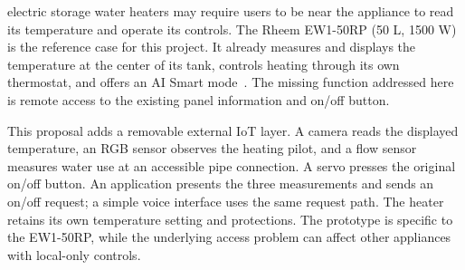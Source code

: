  electric storage water heaters may require users to be near the appliance to read its temperature and operate its controls. The Rheem EW1-50RP (50 L, 1500 W) is the reference case for this project. It already measures and displays the temperature at the center of its tank, controls heating through its own thermostat, and offers an AI Smart mode~\cite{rheemmanual}. The missing function addressed here is remote access to the existing panel information and on/off button.

This proposal adds a removable external IoT layer. A camera reads the displayed temperature, an RGB sensor observes the heating pilot, and a flow sensor measures water use at an accessible pipe connection. A servo presses the original on/off button. An application presents the three measurements and sends an on/off request; a simple voice interface uses the same request path. The heater retains its own temperature setting and protections. The prototype is specific to the EW1-50RP, while the underlying access problem can affect other appliances with local-only controls.
